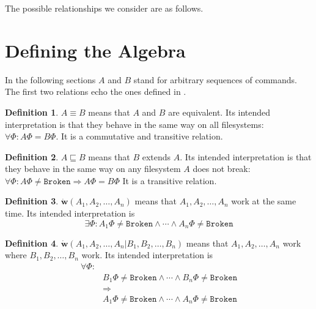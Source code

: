 \documentclass[12pt]{article}
\newcommand{\empt}{\bot}
\newcommand{\fsbroken}{\mathtt{Broken}} %
\newcommand{\FS}{\Phi} %
\newcommand{\pp}{p\!\!\uparrow} %
\newcommand{\fscommand}[2]{{#1#2}}
\newcommand{\fsregcommandchar}[1]{\mathtt{#1}}
\newcommand{\fsregcommand}[2]{\fscommand{\fsregcommandchar{#1}}{\fsregcommandchar{#2}}}
\newcommand{\cfb}{\fsregcommand{F}{\empt}}
\newcommand{\cdb}{\fsregcommand{D}{\empt}}
\newcommand{\eqext}{\sqsubseteq}
\newcommand{\works}[1]{\dot{\mathbf{w}}({#1})}
\newcommand{\worksc}[2]{\dot{\mathbf{w}}({#1}|{#2})}
\theoremstyle{definition}
\newtheorem{mydef}{Definition}
\begin{document}
The possible relationships we
consider are as follows.




\section{Defining the Algebra}

In the following sections $A$ and $B$ stand for arbitrary sequences of commands.
The first two relations echo the ones defined in \cite{NREC:alg}.

\begin{mydef}
$A\equiv B$ means that $A$ and $B$ are equivalent.
Its intended interpretation is that they behave in the same way on
all filesystems: $\forall \FS: A\FS=B\FS$.
It is a commutative and transitive relation.
\end{mydef}

\begin{mydef}
$A\eqext B$ means that $B$ extends $A$.
Its intended interpretation is that they behave in the same way
on any filesystem $A$ does not break:
$\forall \FS: A\FS\neq\fsbroken\Rightarrow A\FS=B\FS$
It is a transitive relation.
\end{mydef}

\begin{mydef}
$\works{A_1,A_2,\ldots,A_n}$ means that 
$A_1,A_2,\ldots,A_n$ work at the same time.
Its intended interpretation is
\[\exists \FS: A_1\FS\neq\fsbroken \wedge \cdots \wedge A_n\FS\neq\fsbroken\]
\end{mydef}

\begin{mydef}
$\worksc{A_1,A_2,\ldots,A_n}{B_1,B_2,\ldots,B_n}$ means that 
$A_1,A_2,\ldots,A_n$ work where $B_1,B_2,\ldots,B_n$ work.
Its intended interpretation is
\begin{align*}
\forall \FS:&\\ 
&B_1\FS\neq\fsbroken \wedge \cdots \wedge B_n\FS\neq\fsbroken\\
&\Rightarrow\\
&A_1\FS\neq\fsbroken \wedge \cdots \wedge A_n\FS\neq\fsbroken
\end{align*}
\end{mydef}
\end{document}
